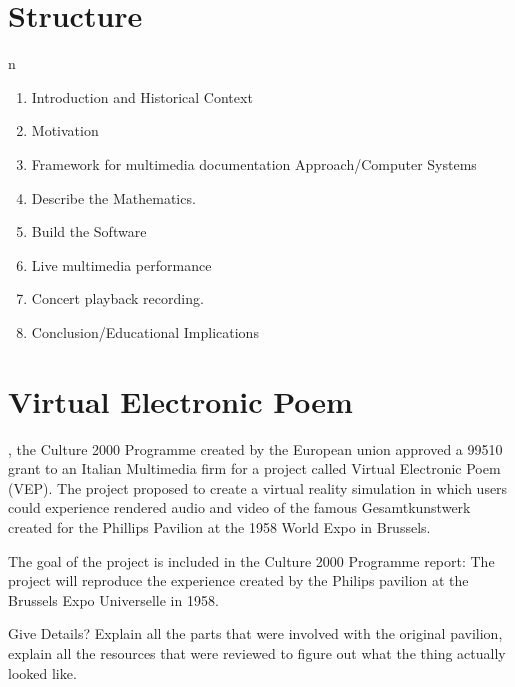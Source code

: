 \section{Structure}
\label{sec:structure}

n
\begin{enumerate}
\item Introduction and  Historical Context %
\item Motivation
\item Framework for multimedia documentation Approach/Computer Systems
\item Describe the Mathematics. %
\item Build the Software
\item Live multimedia performance
\item Concert playback recording. 
\item Conclusion/Educational Implications
\end{enumerate}


\section{Virtual Electronic Poem}
\label{sec:vep}

, the Culture 2000 Programme created by the 
European union approved a 99510\EUR{} grant to an Italian Multimedia 
firm for a project called Virtual Electronic Poem (VEP)\cite{eu2004}. 
The project proposed to create a virtual reality simulation in which 
users could experience rendered audio and video of the famous
Gesamtkunstwerk created for the Phillips Pavilion at the 1958 World
Expo in Brussels. 

The goal of the project is included in the Culture 2000 Programme
report: The project will reproduce the experience created by the
Philips pavilion at the Brussels Expo Universelle in 1958.

Give Details? Explain all the parts that were involved with the
original pavilion, explain all the resources that were reviewed to
figure out what the thing actually looked like.

